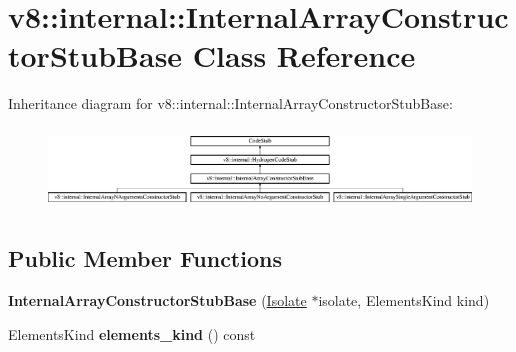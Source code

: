 \hypertarget{classv8_1_1internal_1_1_internal_array_constructor_stub_base}{}\section{v8\+:\+:internal\+:\+:Internal\+Array\+Constructor\+Stub\+Base Class Reference}
\label{classv8_1_1internal_1_1_internal_array_constructor_stub_base}
Inheritance diagram for v8\+:\+:internal\+:\+:Internal\+Array\+Constructor\+Stub\+Base\+:\begin{figure}[H]
\begin{center}
\leavevmode
\includegraphics[height=2.176871cm]{classv8_1_1internal_1_1_internal_array_constructor_stub_base}
\end{center}
\end{figure}
\subsection*{Public Member Functions}
\begin{DoxyCompactItemize}
\item 
\hypertarget{classv8_1_1internal_1_1_internal_array_constructor_stub_base_a605f66a15ede898fefd5fe310c4c2860}{}{\bfseries Internal\+Array\+Constructor\+Stub\+Base} (\hyperlink{classv8_1_1internal_1_1_isolate}{Isolate} $\ast$isolate, Elements\+Kind kind)\label{classv8_1_1internal_1_1_internal_array_constructor_stub_base_a605f66a15ede898fefd5fe310c4c2860}

\item 
\hypertarget{classv8_1_1internal_1_1_internal_array_constructor_stub_base_ad1224e3313ec9f9179913ac544aee07a}{}Elements\+Kind {\bfseries elements\+\_\+kind} () const \label{classv8_1_1internal_1_1_internal_array_constructor_stub_base_ad1224e3313ec9f9179913ac544aee07a}

\end{DoxyCompactItemize}
